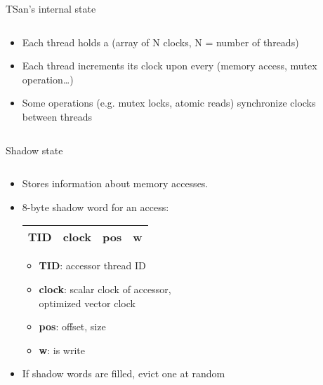 \begin{frame}{TSan’s internal state}
  \begin{columns}[T]
    \begin{column}{0.5\textwidth}
      \begin{itemize}
        \item Each thread holds a  (array of N clocks, N = number of threads)
        \item<2-> Each thread increments its clock upon every  (memory access, mutex operation…)
        \item<4-> Some operations (e.g. mutex locks, atomic reads) synchronize clocks between threads
      \end{itemize}
    \end{column}
    \begin{column}{0.5\textwidth}
      \centering
    \end{column}
  \end{columns}
\end{frame}

\begin{frame}{Shadow state}
  \begin{columns}
    \begin{column}{0.5\textwidth}
      \begin{itemize}
        \item Stores information about memory accesses.
        \item 8-byte shadow word for an access:
          {\footnotesize
          \begin{center}
            \begin{tabular}{|c|c|c|c|}
              \hline
              TID & clock & pos & w \\
              \hline
            \end{tabular}
          \end{center}
            \begin{itemize}
              \footnotesize
              \item \textbf{TID}: accessor thread ID
              \item \textbf{clock}: scalar clock of accessor, \\ \quad optimized vector clock
              \item \textbf{pos}: offset, size
              \item \textbf{w}: is write
            \end{itemize}%
          }
        \item If shadow words are filled, evict one at random
      \end{itemize}
    \end{column}
    \begin{column}{0.5\textwidth}
      
    \end{column}
  \end{columns}
\end{frame}

